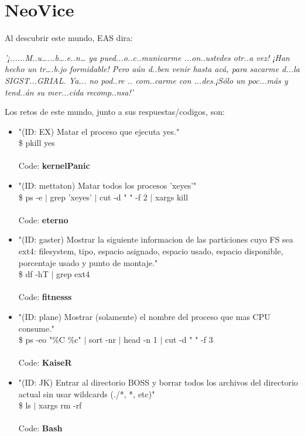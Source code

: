 \documentclass[a4paper,10pt]{article}
\begin{document}
\section{NeoVice}
	Al descubrir este mundo, EAS dira:
	
	\textit{'¡......M..u…...b….e..n… ya pued...o..c..municarme ...on..ustedes otr..a vez! ¡Han hecho un tr….b.jo formidable! Pero aún d..ben venir hasta acá, para sacarme d...la SIGST...GRIAL. Ya... no pod..re .. com..carme con ...des.¡Sólo un poc...más y tend..án su mer...cida recomp..nsa!'\\}	

	Los retos de este mundo, junto a sus respuestas/codigos, son:
	
	\begin{itemize}
		\item "(ID: EX) Matar el proceso que ejecuta yes." \\ 
			\$ pkill yes \\ \\
			Code: \textbf{kernelPanic}
			
		\item "(ID: mettaton) Matar todos los procesos 'xeyes'"\\
			\$ ps -e $|$ grep 'xeyes' $|$ cut -d " " -f 2 $|$ xargs kill \\ \\
			Code: \textbf{eterno}
			
		\item "(ID: gaster) Mostrar la siguiente informacion de las particiones cuyo FS sea ext4: filesystem, tipo, espacio asignado, espacio usado, espacio disponible, porcentaje usado y punto de montaje."\\
			\$ df -hT $|$ grep ext4 \\ \\
			Code: \textbf{fitnesss}
			
		\item "(ID: plane) Mostrar (solamente) el nombre del proceso que mas CPU consume."\\
			\$ ps -eo "\%C \%c" $|$ sort -nr $|$ head -n 1 $|$ cut -d " " -f 3\\ \\
			Code: \textbf{KaiseR}
			
		\item "(ID: JK) Entrar al directorio BOSS y borrar todos los archivos del directorio actual sin usar wildcards (./*, *, etc)"\\
			\$ ls $|$ xargs rm -rf \\ \\
			Code: \textbf{Bash}
	\end{itemize}
	
\end{document}

